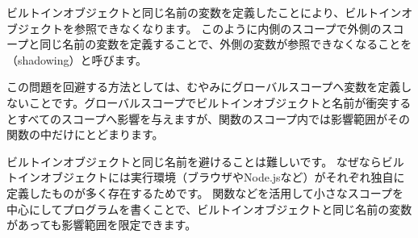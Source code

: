 ビルトインオブジェクトと同じ名前の変数を定義したことにより、ビルトインオブジェクトを参照できなくなります。
このように内側のスコープで外側のスコープと同じ名前の変数を定義することで、外側の変数が参照できなくなることを\textbf{}（shadowing）と呼びます。

この問題を回避する方法としては、むやみにグローバルスコープへ変数を定義しないことです。グローバルスコープでビルトインオブジェクトと名前が衝突するとすべてのスコープへ影響を与えますが、関数のスコープ内では影響範囲がその関数の中だけにとどまります。

ビルトインオブジェクトと同じ名前を避けることは難しいです。
なぜならビルトインオブジェクトには実行環境（ブラウザやNode.jsなど）がそれぞれ独自に定義したものが多く存在するためです。
関数などを活用して小さなスコープを中心にしてプログラムを書くことで、ビルトインオブジェクトと同じ名前の変数があっても影響範囲を限定できます。

